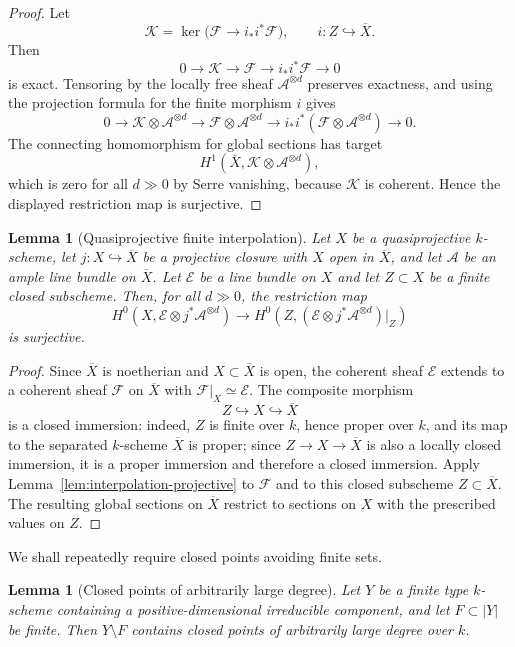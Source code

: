 \documentclass{lms}
\newtheorem{lemma}[theorem]{Lemma}
\newcommand{\Ample}{\mathcal A}
\newcommand{\EE}{\mathcal E}
\newcommand{\FF}{\mathcal F}
\newcommand{\barX}{\overline{X}}
\begin{document}
\begin{proof}
Let
\[
        \mathcal K=
        \ker\bigl(\FF\longrightarrow i_*i^*\FF\bigr),
        \qquad i:Z\hookrightarrow\barX.
\]
Then
\[
0\longrightarrow \mathcal K
\longrightarrow \FF
\longrightarrow i_*i^*\FF
\longrightarrow0
\]
is exact.  Tensoring by the locally free sheaf $\Ample^{\otimes d}$ preserves exactness, and using the projection formula for the finite morphism $i$ gives
\[
0\longrightarrow \mathcal K\otimes\Ample^{\otimes d}
\longrightarrow \FF\otimes\Ample^{\otimes d}
\longrightarrow i_*i^*(\FF\otimes\Ample^{\otimes d})
\longrightarrow0 .
\]
The connecting homomorphism for global sections has target
\[
        H^1(\barX,\mathcal K\otimes\Ample^{\otimes d}),
\]
which is zero for all $d\gg0$ by Serre vanishing, because $\mathcal K$ is coherent.  Hence the displayed restriction map is surjective.
\end{proof}

\begin{lemma}[Quasiprojective finite interpolation]\label{lem:interpolation-quasi}
Let $X$ be a quasiprojective $k$-scheme, let $j:X\hookrightarrow \barX$ be a projective closure with $X$ open in $\barX$, and let $\Ample$ be an ample line bundle on $\barX$.  Let $\EE$ be a line bundle on $X$ and let $Z\subset X$ be a finite closed subscheme.  Then, for all $d\gg0$, the restriction map
\[
        H^0(X,\EE\otimes j^*\Ample^{\otimes d})
        \longrightarrow
        H^0(Z,(\EE\otimes j^*\Ample^{\otimes d})|_Z)
\]
is surjective.
\end{lemma}

\begin{proof}
Since $\barX$ is noetherian and $X\subset\barX$ is open, the coherent sheaf $\EE$ extends to a coherent sheaf $\FF$ on $\barX$ with $\FF|_X\simeq\EE$.  The composite morphism
\[
        Z\hookrightarrow X\hookrightarrow\barX
\]
is a closed immersion: indeed, $Z$ is finite over $k$, hence proper over $k$, and its map to the separated $k$-scheme $\barX$ is proper; since $Z\to X\to\barX$ is also a locally closed immersion, it is a proper immersion and therefore a closed immersion.  Apply Lemma~\ref{lem:interpolation-projective} to $\FF$ and to this closed subscheme $Z\subset\barX$.  The resulting global sections on $\barX$ restrict to sections on $X$ with the prescribed values on $Z$.
\end{proof}

We shall repeatedly require closed points avoiding finite sets.

\begin{lemma}[Closed points of arbitrarily large degree]\label{lem:closedpoints}
Let $Y$ be a finite type $k$-scheme containing a positive-dimensional irreducible component, and let $F\subset |Y|$ be finite.  Then $Y\setminus F$ contains closed points of arbitrarily large degree over $k$.
\end{lemma}
\end{document}
